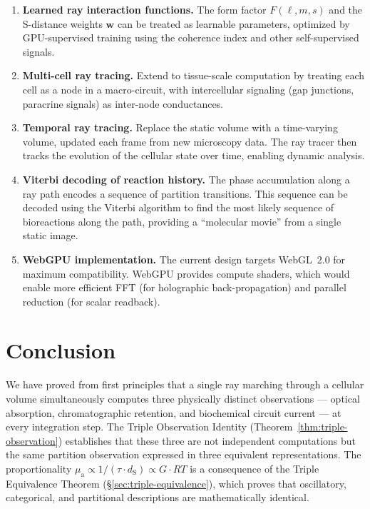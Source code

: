 \documentclass[11pt,twocolumn,a4paper]{article}
\newcommand{\dS}{d_{\mathrm{S}}}
\newcommand{\muabs}{\mu_{\mathrm{a}}}
\begin{document}
\begin{enumerate}[leftmargin=*,itemsep=2pt]
\item \textbf{Learned ray interaction functions.} The form factor
  $F(\ell,m,s)$ and the S-distance weights $\mathbf{w}$ can be
  treated as learnable parameters, optimized by GPU-supervised
  training using the coherence index and other self-supervised
  signals.

\item \textbf{Multi-cell ray tracing.} Extend to tissue-scale
  computation by treating each cell as a node in a macro-circuit,
  with intercellular signaling (gap junctions, paracrine signals)
  as inter-node conductances.

\item \textbf{Temporal ray tracing.} Replace the static volume with a
  time-varying volume, updated each frame from new microscopy data.
  The ray tracer then tracks the evolution of the cellular state over
  time, enabling dynamic analysis.

\item \textbf{Viterbi decoding of reaction history.} The phase
  accumulation along a ray path encodes a sequence of partition
  transitions. This sequence can be decoded using the Viterbi
  algorithm \citep{viterbi1967} to find the most likely sequence of
  bioreactions along the path, providing a ``molecular movie'' from a
  single static image.

\item \textbf{WebGPU implementation.} The current design targets
  WebGL~2.0 for maximum compatibility. WebGPU \citep{webgpu2024}
  provides compute shaders, which would enable more efficient FFT
  (for holographic back-propagation) and parallel reduction (for
  scalar readback).
\end{enumerate}


\section{Conclusion}
\label{sec:conclusion}

We have proved from first principles that a single ray marching through
a cellular volume simultaneously computes three physically distinct
observations --- optical absorption, chromatographic retention, and
biochemical circuit current --- at every integration step. The Triple
Observation Identity (Theorem~\ref{thm:triple-observation}) establishes
that these three are not independent computations but the same
partition observation expressed in three equivalent representations.
The proportionality $\muabs \propto 1/(\tau \cdot \dS) \propto G \cdot
RT$ is a consequence of the Triple Equivalence Theorem
(\S\ref{sec:triple-equivalence}), which proves that oscillatory,
categorical, and partitional descriptions are mathematically identical.
\end{document}
